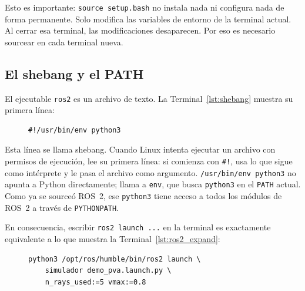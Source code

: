 Esto es importante: \texttt{source setup.bash} no instala nada ni configura nada de forma permanente. Solo modifica las variables de entorno de la terminal actual. Al cerrar esa terminal, las modificaciones desaparecen. Por eso es necesario sourcear en cada terminal nueva.

\subsection{El shebang y el PATH}

El ejecutable \texttt{ros2} es un archivo de texto. La Terminal~\ref{lst:shebang} muestra su primera línea:

\begin{figure}[H]
\centering
\begin{lstlisting}[style=bash, caption={Primera línea del ejecutable \texttt{ros2}.}, label={lst:shebang}]
#!/usr/bin/env python3
\end{lstlisting}
\end{figure}

Esta línea se llama shebang. Cuando Linux intenta ejecutar un archivo con permisos de ejecución, lee su primera línea: si comienza con \texttt{\#!}, usa lo que sigue como intérprete y le pasa el archivo como argumento. \texttt{/usr/bin/env python3} no apunta a Python directamente; llama a \texttt{env}, que busca \texttt{python3} en el \texttt{PATH} actual. Como ya se sourceó ROS~2, ese \texttt{python3} tiene acceso a todos los módulos de ROS~2 a través de \texttt{PYTHONPATH}.

En consecuencia, escribir \texttt{ros2 launch ...} en la terminal es exactamente equivalente a lo que muestra la Terminal~\ref{lst:ros2_expand}:

\begin{figure}[H]
\centering
\begin{lstlisting}[style=bash, caption={Equivalencia entre el comando y su expansión real.}, label={lst:ros2_expand}]
python3 /opt/ros/humble/bin/ros2 launch \
    simulador demo_pva.launch.py \
    n_rays_used:=5 vmax:=0.8
\end{lstlisting}
\end{figure}
